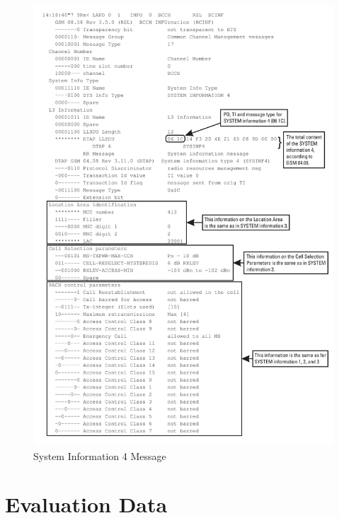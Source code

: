 \begin{figure}
\centering
\includegraphics[width=.9\textwidth]{../Images/sysinfo4}
\caption{System Information 4 Message}
\end{figure}
\chapter{Evaluation Data}

